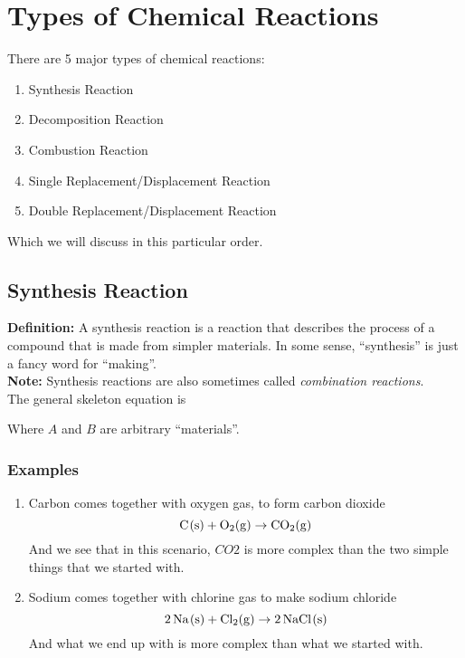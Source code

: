 \documentclass[12pt]{report}
\begin{document}
\newpage 
\section{Types of Chemical Reactions}
There are 5 major types of chemical reactions: 
\begin{enumerate}
    \setlength\itemsep{0.75em}
    \item{Synthesis Reaction}
    \item{Decomposition Reaction} 
    \item{Combustion Reaction} 
    \item{Single Replacement/Displacement Reaction} 
    \item{Double Replacement/Displacement Reaction} 
\end{enumerate}
Which we will discuss in this particular order. 

\subsection{Synthesis Reaction}
\textbf{Definition:}  A synthesis reaction is a reaction  that describes the process of a compound that is made from simpler materials. In some sense, ``synthesis'' is just a fancy word for ``making''.\\ 

\textbf{Note:} Synthesis reactions are also sometimes called \textit{combination reactions}.\\

The general skeleton equation is 
\begin{center}
\end{center}

Where $A$ and $B$ are arbitrary ``materials''.\\

\subsubsection{Examples}
\begin{enumerate}
\setlength\itemsep{0.5em}
    \item{Carbon comes together with oxygen gas, to form carbon dioxide
            \[
                \ce{C(s)}+ \ce{O2(g)}\to \ce{CO2(g)}
            \]
        And we see that in this scenario, $ CO2$ is more complex than the two simple things that we started with.  
        }
    \item{Sodium comes together with chlorine gas to make sodium chloride 
            \[
                \ce{2Na(s)}+ \ce{Cl2(g)}\to \ce{2NaCl(s)}
            \]
        And what we end up with is more complex than what we started with.\\
        }
    
\end{enumerate}
\end{document}
